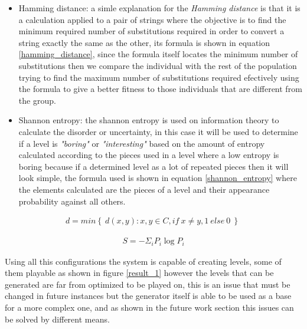 \documentclass[conference]{IEEEtran}
\begin{document}
\begin{itemize}
    \item Hamming distance: a simle explanation for the \textit{Hamming
    distance} is that it is a calculation applied to a pair of strings where the
    objective is to find the minimum required number of substitutions required in
    order to convert a string exactly the same as the other, its formula is
    shown in equation \ref{hamming_distance}, since the formula itself locates
    the minimum number of substitutions then we compare the individual
    with the rest of the population trying to find the maximum number of
    substitutions required efectively using the formula to give a better fitness
    to those individuals that are different from the group.
    \item Shannon entropy: the shannon entropy is used on information theory to
    calculate the disorder or uncertainty, in this case it will be used to
    determine if a level is \textit{"boring"} or \textit{"interesting"} based on
    the amount of entropy calculated according to the pieces used in a level
    where a low entropy is boring because if a determined level as a lot of
    repeated pieces then it will look simple, the formula used is shown in
    equation \ref{shannon_entropy} where the elements calculated are the pieces
    of a level and their appearance probability against all others.
\end{itemize}

\begin{equation}
    \begin{aligned}
    d = min \left\{ \ d(x,y): x,y \in C, if \: x \neq y, 1 \: else \: 0 \: \right\} \
    \end{aligned}
    \label{hamming_distance}
\end{equation}

\begin{equation}
    \begin{aligned}
    S = - \Sigma_i P_i \log P_i
    \end{aligned}
    \label{shannon_entropy}
\end{equation}

Using all this configurations the system is capable of creating levels, some of
them playable as shown in figure \ref{result_1} however the levels that can be
generated are far from optimized to be played on, this is an issue that must be
changed in future instances but the generator itself is able to be used as a
base for a more complex one, and as shown in the future work section this issues
can be solved by different means.
\end{document}
